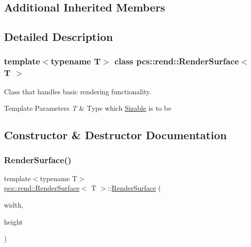\subsection*{Additional Inherited Members}


\subsection{Detailed Description}
\subsubsection*{template$<$typename T$>$\newline
class pcs\+::rend\+::\+Render\+Surface$<$ T $>$}

Class that handles basic rendering functionality. 


\begin{DoxyTemplParams}{Template Parameters}
{\em T} & Type which \hyperlink{structpcs_1_1Sizable}{Sizable} is to be \\
\hline
\end{DoxyTemplParams}


\subsection{Constructor \& Destructor Documentation}
\mbox{\label{classpcs_1_1rend_1_1RenderSurface_a908ee596a69b977a74270f03ecc90808}} 
\subsubsection{\texorpdfstring{Render\+Surface()}{RenderSurface()}}
{\footnotesize\ttfamily template$<$typename T$>$ \\
\hyperlink{classpcs_1_1rend_1_1RenderSurface}{pcs\+::rend\+::\+Render\+Surface}$<$ T $>$\+::\hyperlink{classpcs_1_1rend_1_1RenderSurface}{Render\+Surface} (\begin{DoxyParamCaption}\item[{const T}]{width,  }\item[{const T}]{height }\end{DoxyParamCaption})\hspace{0.3cm}{\ttfamily [inline]}}



